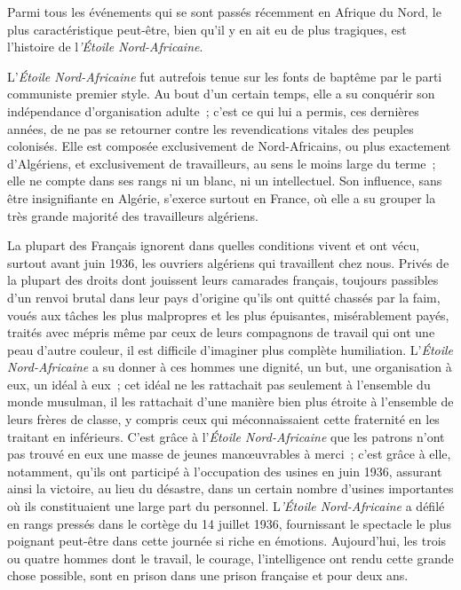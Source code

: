 \documentclass[french,twoside]{book} %
\begin{document}
\noindent Parmi tous les événements qui se sont passés récemment en Afrique du Nord, le plus caractéristique peut-être, bien qu'il y en ait eu de plus tragiques, est l'histoire de l{\itshape 'Étoile Nord-Africaine}.\par
L'{\itshape Étoile Nord-Africaine} fut autrefois tenue sur les fonts de baptême par le parti communiste premier style. Au bout d'un certain temps, elle a su conquérir son indépendance d'organisation adulte ; c'est ce qui lui a permis, ces dernières années, de ne pas se retourner contre les revendications vitales des peuples colonisés. Elle est composée exclusivement de Nord-Africains, ou plus exactement d'Algériens, et exclusivement de travailleurs, au sens le moins large du terme ; elle ne compte dans ses rangs ni un blanc, ni un intellectuel. Son influence, sans être insignifiante en Algérie, s'exerce surtout en France, où elle a su grouper la très grande majorité des travailleurs algériens.\par
La plupart des Français ignorent dans quelles conditions vivent et ont vécu, surtout avant juin 1936, les ouvriers algériens qui travaillent chez nous. Privés de la plupart des droits dont jouissent leurs camarades français, tou­jours passibles d'un renvoi brutal dans leur pays d'origine qu'ils ont quitté chassés par la faim, voués aux tâches les plus malpropres et les plus épuisantes, misérablement payés, traités avec mépris même par ceux de leurs compagnons de travail qui ont une peau d'autre couleur, il est difficile d'imaginer plus complète humiliation. L'{\itshape Étoile Nord-Africaine} a su donner à ces hommes une dignité, un but, une organisation à eux, un idéal à eux ; cet idéal ne les rattachait pas seulement à l'ensemble du monde musulman, il les rattachait d'une manière bien plus étroite à l'ensemble de leurs frères de classe, y compris ceux qui méconnaissaient cette fraternité en les traitant en inférieurs. C'est grâce à l'{\itshape Étoile Nord-Africaine} que les patrons n'ont pas trouvé en eux une masse de jeunes manœuvrables à merci ; c'est grâce à elle, notamment, qu'ils ont participé à l'occupation des usines en juin 1936, assurant ainsi la victoire, au lieu du désastre, dans un certain nombre d'usines importantes où ils constituaient une large part du personnel. L{\itshape 'Étoile Nord-Africaine} a défilé en rangs pressés dans le cortège du 14 juillet 1936, fournissant le spectacle le plus poignant peut-être dans cette journée si riche en émotions. Aujourd'hui, les trois ou quatre hommes dont le travail, le courage, l'intelligence ont rendu cette grande chose possible, sont en prison dans une prison française et pour deux ans.\par
\end{document}
